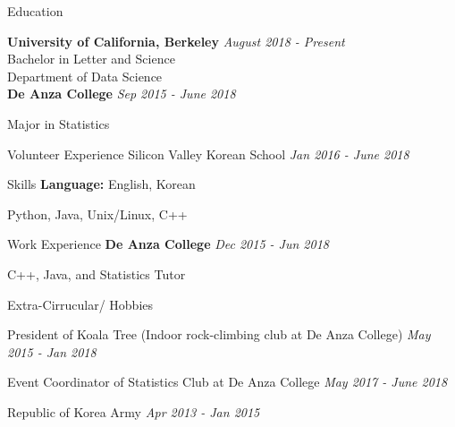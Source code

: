 \documentclass{resume} %
\begin{document}

\begin{rSection}{Education}

{\bf University of California, Berkeley} \hfill {\em August 2018 - Present} 
\\ Bachelor in Letter and Science
\\ Department of Data Science\\

\textbf{De Anza College} \hfill {\em Sep 2015 - June 2018}
\item Major in Statistics

\end{rSection}

\begin{rSection}{Volunteer Experience}
Silicon Valley Korean School \hfill {\em Jan 2016 - June 2018 }
\end{rSection}

\begin{rSection}{Skills}
\textbf{Language:} English, Korean

Python, Java, Unix/Linux, C++
\end{rSection}


\begin{rSection}{Work Experience}
\textbf{De Anza College} \hfill {\em \textit{Dec 2015 - Jun 2018} }
\item {C++, Java, and Statistics Tutor}
\end{rSection}

\begin{rSection}{Extra-Cirrucular/ Hobbies} \itemsep -3pt
\item President of Koala Tree (Indoor rock-climbing club at De Anza College) \hfill {\em May 2015 - Jan 2018}
\item Event Coordinator of Statistics Club at De Anza College \hfill {\textit{May 2017 - June 2018}}
\item Republic of Korea Army \hfill {\em Apr 2013 - Jan 2015}

\end{rSection}
\end{document}
